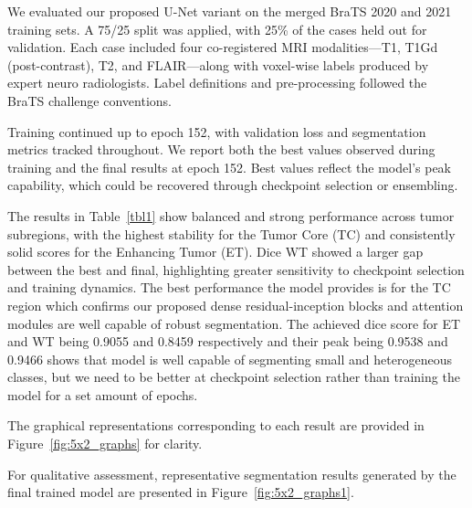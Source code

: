 \documentclass[a4paper,fleqn]{cas-dc}
\begin{document}
We evaluated our proposed U-Net variant on the merged BraTS 2020 and 2021 training sets. A 75/25 split was applied, with 25\% of the cases held out for validation. Each case included four co-registered MRI modalities—T1, T1Gd (post-contrast), T2, and FLAIR—along with voxel-wise labels produced by expert neuro radiologists. Label definitions and pre-processing followed the BraTS challenge conventions.

Training continued up to epoch 152, with validation loss and segmentation metrics tracked throughout. We report both the best values observed during training and the final results at epoch 152. Best values reflect the model's peak capability, which could be recovered through checkpoint selection or ensembling.

The results in Table~\ref{tbl1} show balanced and strong performance across tumor subregions, with the highest stability for the Tumor Core (TC) and consistently solid scores for the Enhancing Tumor (ET). Dice WT showed a larger gap between the best and final, highlighting greater sensitivity to checkpoint selection and training dynamics. The best performance the model provides is for the TC region which confirms our proposed dense residual-inception blocks and attention modules are well capable of robust segmentation. The achieved dice score for ET and WT being 0.9055 and 0.8459 respectively and their peak being 0.9538 and 0.9466 shows that model is well capable of segmenting small and heterogeneous classes, but we need to be better at checkpoint selection rather than training the model for a set amount of epochs.

The graphical representations corresponding to each result are provided in Figure~\ref{fig:5x2_graphs} for clarity.

For qualitative assessment, representative segmentation results generated by the final trained model are presented in Figure~\ref{fig:5x2_graphs1}.
\end{document}
